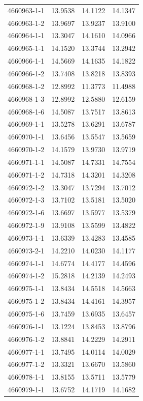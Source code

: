 \begin{longtable}{lrrr}
4660963-1-1 & 13.9538 & 14.1122 & 14.1347 \\
4660963-1-2 & 13.9697 & 13.9237 & 13.9100 \\
4660964-1-1 & 13.3047 & 14.1610 & 14.0966 \\
4660965-1-1 & 14.1520 & 13.3744 & 13.2942 \\
4660966-1-1 & 14.5669 & 14.1635 & 14.1822 \\
4660966-1-2 & 13.7408 & 13.8218 & 13.8393 \\
4660968-1-2 & 12.8992 & 11.3773 & 11.4988 \\
4660968-1-3 & 12.8992 & 12.5880 & 12.6159 \\
4660968-1-6 & 14.5087 & 13.7517 & 13.8613 \\
4660969-1-1 & 13.5278 & 13.6291 & 13.6787 \\
4660970-1-1 & 13.6456 & 13.5547 & 13.5659 \\
4660970-1-2 & 14.1579 & 13.9730 & 13.9719 \\
4660971-1-1 & 14.5087 & 14.7331 & 14.7554 \\
4660971-1-2 & 14.7318 & 14.3201 & 14.3208 \\
4660972-1-2 & 13.3047 & 13.7294 & 13.7012 \\
4660972-1-3 & 13.7102 & 13.5181 & 13.5020 \\
4660972-1-6 & 13.6697 & 13.5977 & 13.5379 \\
4660972-1-9 & 13.9108 & 13.5599 & 13.4822 \\
4660973-1-1 & 13.6339 & 13.4283 & 13.4585 \\
4660973-2-1 & 14.2210 & 14.0230 & 14.1177 \\
4660974-1-1 & 14.6774 & 14.4177 & 14.4596 \\
4660974-1-2 & 15.2818 & 14.2139 & 14.2493 \\
4660975-1-1 & 13.8434 & 14.5518 & 14.5663 \\
4660975-1-2 & 13.8434 & 14.4161 & 14.3957 \\
4660975-1-6 & 13.7459 & 13.6935 & 13.6457 \\
4660976-1-1 & 13.1224 & 13.8453 & 13.8796 \\
4660976-1-2 & 13.8841 & 14.2229 & 14.2911 \\
4660977-1-1 & 13.7495 & 14.0114 & 14.0029 \\
4660977-1-2 & 13.3321 & 13.6670 & 13.5860 \\
4660978-1-1 & 13.8155 & 13.5711 & 13.5779 \\
4660979-1-1 & 13.6752 & 14.1719 & 14.1682 \\

\end{longtable}
